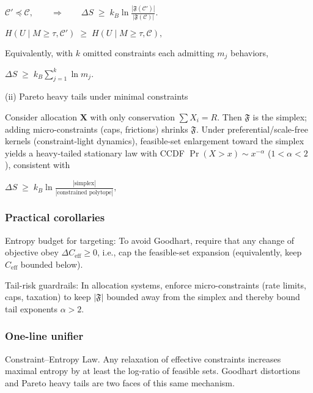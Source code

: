 \documentclass[12pt,a4paper]{article}
\begin{document}
$\mathcal{C}' \preceq \mathcal{C}, \qquad \Rightarrow \qquad \Delta S \;\ge\; k_B \ln \frac{|\mathfrak{F}(\mathcal{C}')|}{|\mathfrak{F}(\mathcal{C})|}.$

$H(U\mid M\ge \tau, \mathcal{C}') \;\ge\; H(U\mid M\ge \tau, \mathcal{C}),$

Equivalently, with $k$ omitted constraints each admitting $m_j$ behaviors,

$\Delta S \;\ge\; k_B \sum_{j=1}^k \ln m_j .$

(ii) Pareto heavy tails under minimal constraints

Consider allocation $\mathbf{X}$ with only conservation $\sum X_i = R$. Then $\mathfrak{F}$ is the simplex; adding micro-constraints (caps, frictions) shrinks $\mathfrak{F}$. Under preferential/scale-free kernels (constraint-light dynamics), feasible-set enlargement toward the simplex yields a heavy-tailed stationary law with CCDF $\Pr(X > x) \sim x^{-\alpha}$ ($1 < \alpha < 2$), consistent with

$\Delta S \;\ge\; k_B \ln \frac{|\text{simplex}|}{|\text{constrained polytope}|},$

\subsubsection{Practical corollaries}

Entropy budget for targeting: To avoid Goodhart, require that any change of objective obey $\Delta C_{\mathrm{eff}} \geq 0$, i.e., cap the feasible-set expansion (equivalently, keep $C_{\mathrm{eff}}$ bounded below).

Tail-risk guardrails: In allocation systems, enforce micro-constraints (rate limits, caps, taxation) to keep $|\mathfrak{F}|$ bounded away from the simplex and thereby bound tail exponents $\alpha > 2$.

\subsubsection{One-line unifier}

Constraint–Entropy Law. Any relaxation of effective constraints increases maximal entropy by at least the log-ratio of feasible sets. Goodhart distortions and Pareto heavy tails are two faces of this same mechanism.



\end{document}

